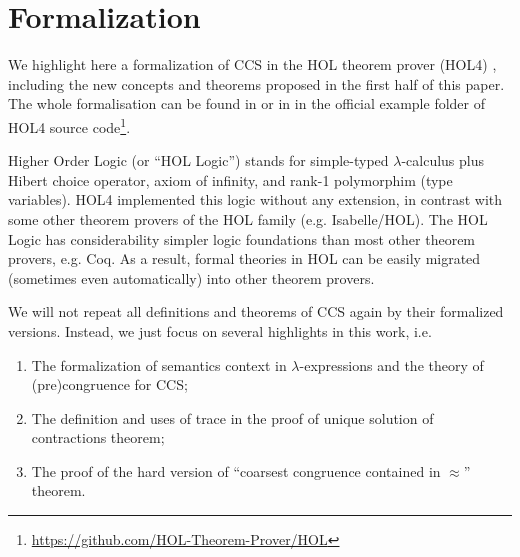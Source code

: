 \section{Formalization}

We highlight here a formalization of CCS
in the HOL theorem
prover (HOL4) \cite{slind2008brief},
including the new concepts and theorems proposed in the first half of
this paper.
The whole formalisation can be found 
in \cite{Tian:2017wrba}  or in 
 in the official example folder of HOL4 source
code\footnote{\url{https://github.com/HOL-Theorem-Prover/HOL}}.

Higher Order Logic (or ``HOL Logic'') \cite{hollogic} stands for simple-typed $\lambda$-calculus plus Hibert
choice operator, axiom of infinity, and rank-1 polymorphim (type
variables). HOL4 implemented this logic without any extension, in
contrast
with
some other theorem provers of the  HOL family (e.g. Isabelle/HOL). 
The HOL Logic has considerability simpler logic
foundations than most other theorem provers, e.g. Coq. As a result,
formal theories in HOL can be easily migrated (sometimes even
automatically) into other theorem provers.



We will not repeat all definitions and theorems of CCS again by their
formalized versions. Instead, we just focus on several highlights in
this work, i.e.
\begin{enumerate}
\item The formalization of semantics context in $\lambda$-expressions and the theory of
  (pre)congruence for CCS;
\item The definition and uses of trace in the proof of unique solution of
  contractions theorem;
\item The proof of the hard version of ``coarsest congruence
  contained in $\approx$'' theorem.
\end{enumerate}


